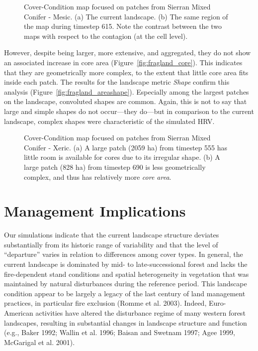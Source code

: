 \begin{figure}[!htbp]
  \centering
  \caption{Cover-Condition map focused on patches from Sierran Mixed Conifer - Mesic. (a) The current landscape. (b) The same region of the map during timestep 615. Note the contrast between the two maps with respect to the contagion (at the cell level).} 
  \label{fig:patchmaps3}
\end{figure}

However, despite being larger, more extensive, and aggregated, they do not show an associated increase in core area (Figure~\ref{fig:fragland_core}). This indicates that they are geometrically more complex, to the extent that little core area fits inside each patch. The results for the landscape metric \emph{Shape} confirm this analysis (Figure~\ref{fig:fragland_areashape}). Especially among the largest patches on the landscape, convoluted shapes are common. Again, this is not to say that large and simple shapes do not occur---they do---but in comparison to the current landscape, complex shapes were characteristic of the simulated HRV.

\begin{figure}[!htbp]
  \centering
  \caption{Cover-Condition map focused on patches from Sierran Mixed Conifer - Xeric. (a) A large patch (2059 ha) from timestep 555 has little room is available for cores due to its irregular shape. (b) A large patch (828 ha) from timestep 690 is less geometrically complex, and thus has relatively more \emph{core area}.} 
  \label{fig:patchmaps4}
\end{figure}

\clearpage
\section{Management Implications}
Our simulations indicate that the current landscape structure deviates substantially from its historic range of variability and that the level of ``departure'' varies in relation to differences among cover types. In general, the current landscape is dominated by mid- to late-successional forest and lacks the fire-dependent stand conditions and spatial heterogeneity in vegetation that was maintained by natural disturbances during the reference period. This landscape condition appear to be largely a legacy of the last century of land management practices, in particular fire exclusion (Romme et al. 2003). Indeed, Euro-American activities have altered the disturbance regime of many western forest landscapes, resulting in substantial changes in landscape structure and function (e.g., Baker 1992; Wallin et al. 1996; Baisan and Swetnam 1997; Agee 1999, McGarigal et al. 2001). 

